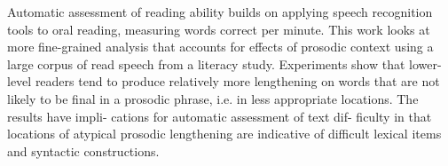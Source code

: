 Automatic assessment of reading ability builds on applying speech recognition tools to oral reading, measuring words correct per minute. This work looks at
 more fine-grained analysis that accounts for effects of prosodic context using
 a large corpus of read speech from a literacy study. Experiments show that
 lower-level readers tend to produce relatively more lengthening on words that
 are not likely to be final in a prosodic phrase, i.e. in less appropriate
 locations. The results have impli- cations for automatic assessment of text
 dif- ficulty in that locations of atypical prosodic lengthening are indicative
 of difficult lexical items and syntactic constructions.

